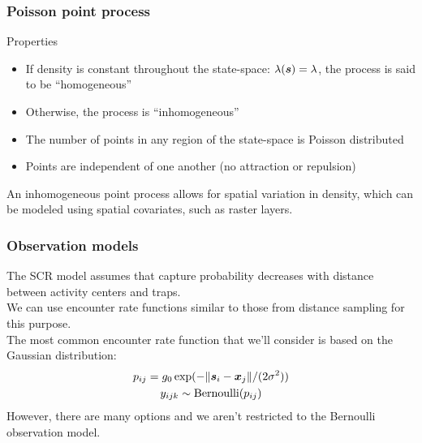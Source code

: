 \documentclass[color=usenames,dvipsnames]{beamer}\usepackage[]{graphicx}\usepackage[]{color}
\begin{document}
\begin{frame}
  \frametitle{Poisson point process}
  Properties
  \begin{itemize}
    \item If density is constant throughout the state-space:
      $\lambda({\bm s}) = \lambda$, the process is said to be
      ``homogeneous''
    \item Otherwise, the process is ``inhomogeneous''
    \item The number of points in any region of the state-space is
      Poisson distributed
    \item Points are independent of one another (no attraction or
      repulsion) 
  \end{itemize}
  \pause
  \vfill
  An inhomogeneous point process allows for spatial variation
  in density, which can be modeled using \alert{spatial covariates},
  such as raster layers. \\
\end{frame}






\begin{frame}
  \frametitle{Observation models}
  The SCR model assumes that capture probability decreases with
  distance between activity centers and traps. \\
  \pause
  \vfill
  We can use encounter rate functions similar to those from distance 
  sampling for this purpose. \\
  \pause
  \vfill
  The most common encounter rate function that we'll consider is based
  on the Gaussian distribution:
  \begin{gather*}
    p_{ij} = g_0\exp(-\|{\bm s}_i - {\bm x}_j\|/(2\sigma^2)) \\
    y_{ijk} \sim \mathrm{Bernoulli}(p_{ij}) 
  \end{gather*}
  \pause
  However, there are many options and we aren't restricted to the
  Bernoulli observation model. 
\end{frame}
\end{document}

